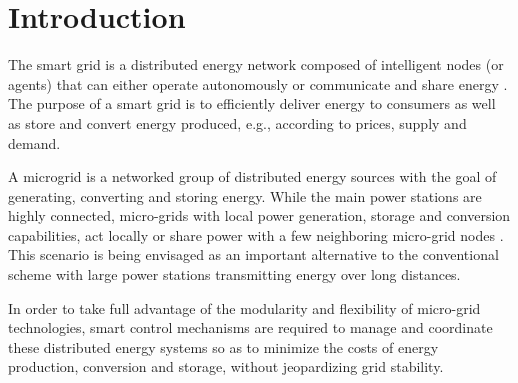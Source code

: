 \section{Introduction} \label{sec:intro}

The smart grid is a distributed energy network composed of intelligent
nodes (or agents) that can either operate autonomously or communicate and share energy \cite{weiss1999multiagent}.
The purpose of a smart grid is to efficiently deliver energy to consumers as well as store and convert
energy produced, e.g., according to prices, supply and demand. 

A microgrid is a networked group of distributed energy sources with the goal of
generating, converting and storing energy. 
While the main power stations are highly connected, micro-grids with local power generation, storage
and conversion capabilities, act locally or share power with a few neighboring micro-grid nodes \cite{farhangi2010path}.
This scenario is being envisaged as an important alternative to the conventional scheme with
large power stations transmitting energy over long distances.

 In order to take full advantage of the modularity and flexibility of micro-grid technologies, smart
control mechanisms are required to manage and coordinate these distributed energy systems so as to
minimize the costs of energy production, conversion and storage, without jeopardizing grid stability.

